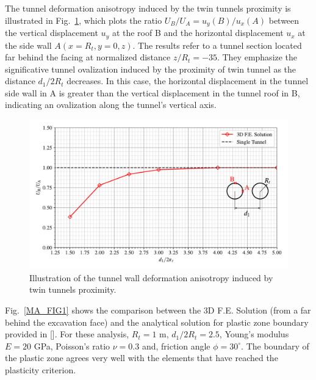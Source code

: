 \documentclass[a4paper,fleqn]{cas-sc}
\begin{document}
The tunnel deformation anisotropy induced by the twin tunnels proximity is illustrated in Fig.~\ref{MA_Relationship between convergence in B and A}, which plots the ratio $U_B/U_A = u_y(B)/u_x(A)$ between the vertical displacement $u_y$ at the roof B and the horizontal displacement $u_x$ at the side wall  $A(x=R_t, y = 0, z)$. The results refer to a tunnel section located far behind the facing at normalized distance $z/R_t = -35$. They emphasize the significative tunnel ovalization induced by the proximity of twin tunnel as the distance $d_1/2R_t$ decreases. In this case, the horizontal displacement in the tunnel side wall in A is greater than the vertical displacement in the tunnel roof in B, indicating an ovalization along the tunnel's vertical axis.

\begin{figure}[h!]
	\centering
	\includegraphics[scale=0.65]{MA_Relationship between Convergence in B and A.pdf}
	\caption{Illustration of the tunnel wall deformation anisotropy induced by twin tunnels proximity.}
	\label{MA_Relationship between convergence in B and A}
\end{figure}
\FloatBarrier

Fig.~\ref{MA_FIG1} shows the comparison between the 3D F.E. Solution (from a far behind the excavation face) and the analytical solution for plastic zone boundary provided in []. For these analysis, $R_t = 1$ m, $d_1/2R_t = 2.5$, Young's modulus $E=20$ GPa, Poisson's ratio $\nu = 0.3$ and, friction angle $\phi = 30^\circ$. The boundary of the plastic zone agrees very well with the elements that have reached the plasticity criterion.
\end{document}
